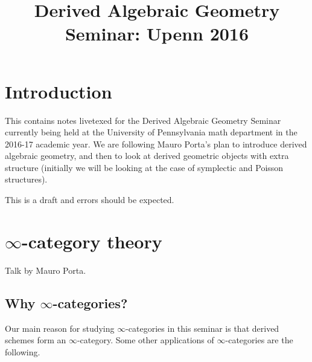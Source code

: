 \documentclass[10pt,a4paper,reqno,oneside]{book} %
\title{Derived Algebraic Geometry Seminar: Upenn 2016}
\theoremstyle{plain}
\theoremstyle{definition}
\theoremstyle{remark}
\numberwithin{equation}{section}
\begin{document}
\maketitle
\tableofcontents

\chapter*{Introduction}
 

This contains notes livetexed for the Derived Algebraic Geometry Seminar currently being held at the University of Pennsylvania math department in the 2016-17 academic year.  We are following Mauro Porta's plan to introduce derived algebraic geometry, and then to look at derived geometric objects with extra structure (initially we will be looking at the case of symplectic and Poisson structures).

This is a draft and errors should be expected.

\chapter{$\infty$-category theory}
Talk by Mauro Porta.

\section{Why $\infty$-categories?}

Our main reason for studying $\infty$-categories in this seminar is that derived schemes form an $\infty$-category.
Some other applications of $\infty$-categories are the following.
\end{document}
